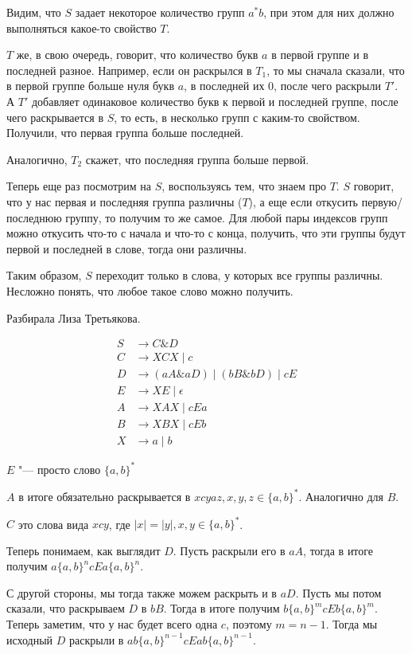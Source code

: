 Видим, что $S$ задает некоторое количество групп $a^*b$, при этом для них должно выполняться какое-то свойство $T$.

$T$ же, в свою очередь, говорит, что количество букв $a$ в первой группе и в последней разное. 
Например, если он раскрылся в $T_1$, то мы сначала сказали, что в первой группе больше нуля букв $a$, в последней их 0, после чего раскрыли $T'$.
А $T'$ добавляет одинаковое количество букв к первой и последней группе, после чего раскрывается в $S$, то есть, в несколько групп с каким-то свойством.
Получили, что первая группа больше последней.

Аналогично, $T_2$ скажет, что последняя группа больше первой.

Теперь еще раз посмотрим на $S$, воспользуясь тем, что знаем про $T$.
$S$ говорит, что у нас первая и последняя группа различны ($T$), а еще если откусить первую/последнюю группу, то получим то же самое. 
Для любой пары индексов групп можно откусить что-то с начала и что-то с конца, получить, что эти группы будут первой и последней в слове, тогда они различны.

Таким образом, $S$ переходит только в слова, у которых все группы различны.
Несложно понять, что любое такое слово можно получить.

Разбирала Лиза Третьякова.

\begin{align*}
S &\to C \& D \\
C &\to XCX \mid c \\
D &\to (aA \& aD) \mid (bB \& bD) \mid cE \\
E &\to XE \mid \epsilon \\
A &\to XAX \mid cEa \\
B &\to XBX \mid cEb \\ 
X &\to a \mid b
\end{align*}

$E$ "--- просто слово $\{a, b\}^*$

$A$ в итоге обязательно раскрывается в $xcyaz, x,y,z \in \{a, b\}^*$.
Аналогично для $B$.

$C$ это слова вида $xcy$, где $|x| = |y|, x, y \in \{a, b\}^*$.

Теперь понимаем, как выглядит $D$. 
Пусть раскрыли его в $aA$, тогда в итоге получим $a\{a, b\}^n cEa \{a, b\}^n$.

С другой стороны, мы тогда также можем раскрыть и в $aD$. 
Пусть мы потом сказали, что раскрываем $D$ в $bB$.
Тогда в итоге получим $b\{a, b\}^m cEb \{a, b\}^m$. 
Теперь заметим, что у нас будет всего одна $c$, поэтому $m = n - 1$.
Тогда мы исходный $D$ раскрыли в $ab\{a, b\}^{n-1} cEab \{a, b\}^{n - 1}$.


